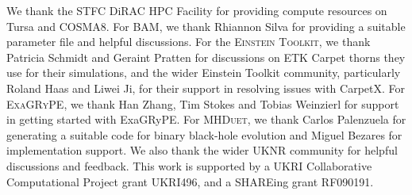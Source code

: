 \documentclass[12pt,a4paper]{article}
\numberwithin{figure}{subsection}
\newcommand{\bam}{\textsc{BAM}\xspace}
\newcommand{\einsteintoolkit}{\textsc{Einstein Toolkit}\xspace}
\newcommand{\exagrype}{\textsc{ExaGRyPE}\xspace}
\newcommand{\mhduet}{\textsc{MHDuet}\xspace}
\begin{document}
We thank the STFC DiRAC HPC Facility for providing compute resources on Tursa
and COSMA8. For \bam, we thank Rhiannon Silva for providing
a suitable parameter file and helpful discussions. For the \einsteintoolkit, we
thank Patricia Schmidt and Geraint Pratten for discussions on ETK Carpet thorns
they use for their simulations, and the wider Einstein Toolkit community,
particularly Roland Haas and Liwei Ji, for their support in resolving issues
with CarpetX. For \exagrype, we thank Han Zhang, Tim Stokes and Tobias
Weinzierl for support in getting started with ExaGRyPE. For \mhduet, we thank
Carlos Palenzuela for generating a suitable code for binary black-hole
evolution and Miguel Bezares for implementation support. We also thank the wider UKNR community for helpful discussions and feedback. This work is supported by a UKRI Collaborative Computational Project grant UKRI496, and a SHAREing grant RF090191.  


\printbibliography
\end{document}
